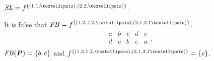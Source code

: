 \documentclass[version=3.21, pagesize, twoside=off, bibliography=totoc, DIV=calc, fontsize=12pt, a4paper]{scrartcl}
\begin{document}
\begin{conjecture}
	\label{th:slVce}
	$\SL = f^{\set{(1, 1, …), (2, 2, …)}}$.
\end{conjecture}

\begin{remark}
	\label{th:fbVce}
	It is false that
	$\FB = f^{\set{(1, 2,1,2, …), (2, 1,2,1 …)}}$.
    \begin{equation}
        \begin{array}{lllll}
                a&b&c&d&e\\
                d&c&b&e&a\\
        \end{array}.
    \end{equation}
    $\mathit{FB}(\bm{P}) = \{b, c\}$ and $f^{\set{(1, 2,1,2, …), (2, 1,2,1 …)}}=\{c\}$.
\end{remark}

\end{document}

